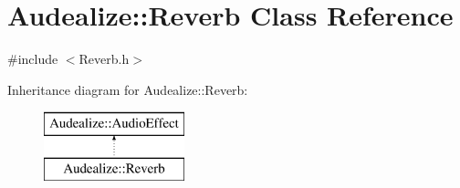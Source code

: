 \hypertarget{class_audealize_1_1_reverb}{}\section{Audealize\+:\+:Reverb Class Reference}
\label{class_audealize_1_1_reverb}


{\ttfamily \#include $<$Reverb.\+h$>$}

Inheritance diagram for Audealize\+:\+:Reverb\+:\begin{figure}[H]
\begin{center}
\leavevmode
\includegraphics[height=2.000000cm]{class_audealize_1_1_reverb}
\end{center}
\end{figure}
